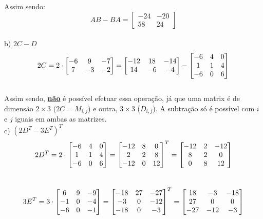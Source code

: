 Assim sendo:
\\

\begin{equation}
    AB - BA =
    \begin{bmatrix}
        -24 & -20 \\
        58  & 24
    \end{bmatrix}
\end{equation}
\\

b) $2C-D$
\\

\[
    2C = 2 \cdot
    \begin{bmatrix} -6 & 9 & -7 \\ 7 & -3 & -2 \end{bmatrix} =
    \begin{bmatrix}
        -12 & 18 & -14 \\
        14  & -6 & -4
    \end{bmatrix} -
    \begin{bmatrix} -6 & 4 & 0 \\ 1 & 1 & 4 \\ -6 & 0 & 6 \end{bmatrix}
\]
\\


\textcolor{COLOR2}{Assim sendo, \textbf{\underline{não}} é possível efetuar essa operação, já que uma matrix é de dimensão $2\times3$ ($2C=M_{i,j}$) e outra, $3\times3$ ($D_{i, j}$). A subtração só é possível com $i$ e $j$ iguais em ambas as matrizes.}
\\

c) $(2D^T-3E^T)^T$
\\

\[
    2D^T = 2 \cdot
    \begin{bmatrix} -6 & 4 & 0 \\ 1 & 1 & 4 \\ -6 & 0 & 6 \end{bmatrix} =
    \begin{bmatrix}
        -12 & 8 & 0  \\
        2   & 2 & 8  \\
        -12 & 0 & 12
    \end{bmatrix}^T =
    \begin{bmatrix}
        -12 & 2 & -12 \\
        8   & 2 & 0   \\
        0   & 8 & 12
    \end{bmatrix}
\]
\\

\[
    3E^T = 3 \cdot
    \begin{bmatrix} 6 & 9 & -9 \\ -1 & 0 & -4 \\ -6 & 0 & -1 \end{bmatrix} =
    \begin{bmatrix}
        -18 & 27 & -27 \\
        -3  & 0  & -12 \\
        -18 & 0  & -3
    \end{bmatrix}^T =
    \begin{bmatrix}
        18  & -3  & -18 \\
        27  & 0   & 0   \\
        -27 & -12 & -3
    \end{bmatrix}
\]
\\

